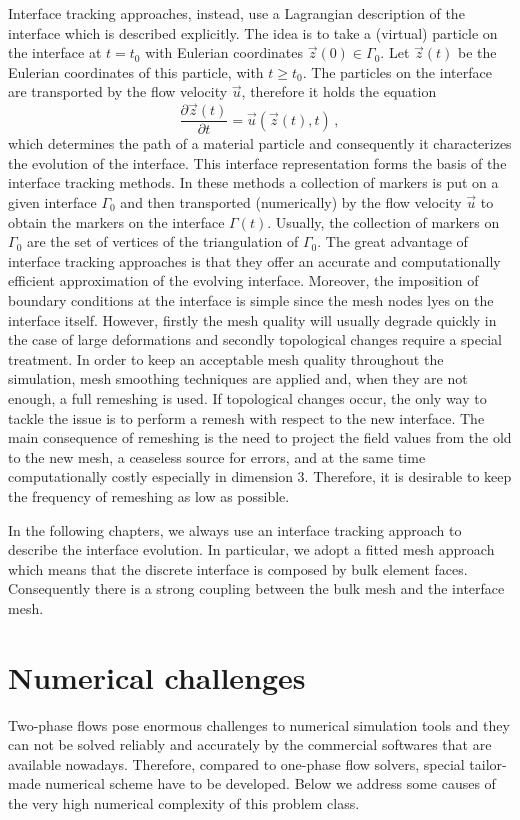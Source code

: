 Interface tracking approaches, instead, use a Lagrangian description of the
interface which is described explicitly. The idea is to take a (virtual)
particle on the interface at $t=t_0$ with Eulerian coordinates $\vec z(0) \in
\Gamma_0$. Let $\vec z(t)$ be the Eulerian coordinates of this particle, with
$t\geq t_0$. The particles on the interface are transported by the flow
velocity $\vec u$, therefore it holds the equation
\begin{equation}
\frac{\partial \vec z(t)}{\partial t}=\vec u(\vec z(t),t)\,,
\end{equation}
which determines the path of a material particle and consequently it
characterizes the evolution of the interface. This interface representation
forms the basis of the interface tracking methods. In these methods a
collection of markers is put on a given interface $\Gamma_0$ and then
transported (numerically) by the flow velocity $\vec u$ to obtain the markers
on the interface $\Gamma(t)$. Usually, the collection of markers on $\Gamma_0$
are the set of vertices of the triangulation of $\Gamma_0$. The great
advantage of interface tracking approaches is that they offer an accurate and
computationally efficient approximation of the evolving interface. Moreover,
the imposition of boundary conditions at the interface is simple since the mesh
nodes lyes on the interface itself. However, firstly the mesh quality will
usually degrade quickly in the case of large deformations and secondly
topological changes require a special treatment. In order to keep an
acceptable mesh quality throughout the simulation, mesh smoothing techniques
are applied and, when they are not enough,  a full remeshing is used. If
topological changes occur, the only way to tackle the issue is to
perform a remesh with respect to the new interface. The main consequence of
remeshing is the need to project the field values from the old to the new
mesh, a ceaseless source for errors, and at the same time computationally
costly especially in dimension 3. Therefore, it is desirable to keep the
frequency of remeshing as low as possible.

In the following chapters, we always use an interface tracking approach to
describe the interface evolution. In particular, we adopt a fitted mesh approach
which means that the discrete interface is composed by bulk element faces.
Consequently there is a strong coupling between the bulk mesh and the interface
mesh.

\section[Numerical challenges]{Numerical challenges}
Two-phase flows pose enormous challenges to numerical simulation tools and
they can not be solved reliably and accurately by the commercial softwares that
are available nowadays. Therefore, compared to one-phase flow solvers, special
tailor-made numerical scheme have to be developed. Below we address some causes
of the very high numerical complexity of this problem class.

